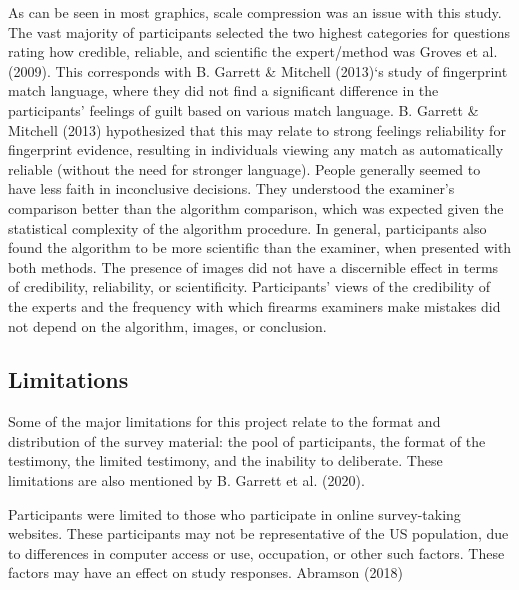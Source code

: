 \documentclass[print]{nuthesis}
\begin{document}
As can be seen in most graphics, scale compression was an issue with this study.
The vast majority of participants selected the two highest categories for questions rating how credible, reliable, and scientific the expert/method was Groves et al. (2009).
This corresponds with B. Garrett \& Mitchell (2013)`s study of fingerprint match language, where they did not find a significant difference in the participants' feelings of guilt based on various match language.
B. Garrett \& Mitchell (2013) hypothesized that this may relate to strong feelings reliability for fingerprint evidence, resulting in individuals viewing any match as automatically reliable (without the need for stronger language).
People generally seemed to have less faith in inconclusive decisions.
They understood the examiner's comparison better than the algorithm comparison, which was expected given the statistical complexity of the algorithm procedure.
In general, participants also found the algorithm to be more scientific than the examiner, when presented with both methods.
The presence of images did not have a discernible effect in terms of credibility, reliability, or scientificity.
Participants' views of the credibility of the experts and the frequency with which firearms examiners make mistakes did not depend on the algorithm, images, or conclusion.

\hypertarget{limitations}{%
\subsection{Limitations}\label{limitations}}

Some of the major limitations for this project relate to the format and distribution of the survey material: the pool of participants, the format of the testimony, the limited testimony, and the inability to deliberate.
These limitations are also mentioned by B. Garrett et al. (2020).

Participants were limited to those who participate in online survey-taking websites.
These participants may not be representative of the US population, due to differences in computer access or use, occupation, or other such factors.
These factors may have an effect on study responses.
Abramson (2018) 
\end{document}
